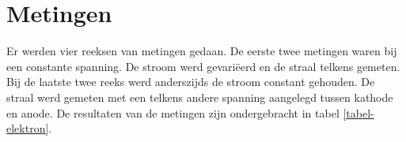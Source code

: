 \section{Metingen}


Er werden vier reeksen van metingen gedaan. De eerste twee metingen waren bij 
een constante spanning. De stroom werd gevari\"eerd en de straal telkens 
gemeten. Bij de laatste twee reeks werd anderszijds de stroom constant 
gehouden. De straal werd gemeten met een telkens andere spanning aangelegd 
tussen kathode en anode. De resultaten van de metingen zijn ondergebracht in 
tabel \ref{tabel-elektron}.



